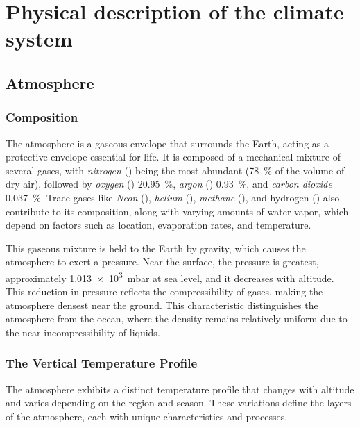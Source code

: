 \chapter{Physical description of the climate system}\label{ch:climate-system-description}

\section{Atmosphere}\label{sec:atmosphere-description}

\subsection{Composition}

The atmosphere is a gaseous envelope that surrounds the Earth, acting as a protective envelope essential for life.
It is composed of a mechanical mixture of several gases, with \emph{nitrogen} () being the most abundant (\qty{78}{\percent} of the volume of dry air),
followed by \emph{oxygen} () \qty{20.95}{\percent}, \emph{argon} () \qty{0.93}{\percent},
and \emph{carbon dioxide}  \qty{0.037}{\percent}.
Trace gases like \emph{Neon} (), \emph{helium} (), \emph{methane} (), and hydrogen () also contribute to its composition, along
with varying amounts of water vapor, which depend on factors such as location, evaporation rates, and temperature.

This gaseous mixture is held to the Earth by gravity, which causes the atmosphere to exert a pressure. Near the surface, the pressure is greatest, approximately \qty{1.013e3}{\milli\bar} at sea level, and it decreases with altitude. This reduction in pressure reflects the compressibility of gases, making the atmosphere densest near the ground. This characteristic distinguishes the atmosphere from the ocean, where the density remains relatively uniform due to the near incompressibility of liquids.

\subsection{The Vertical Temperature Profile}

The atmosphere exhibits a distinct temperature profile that changes with altitude and varies depending on the region and season. These variations define the layers of the atmosphere, each with unique characteristics and processes.

